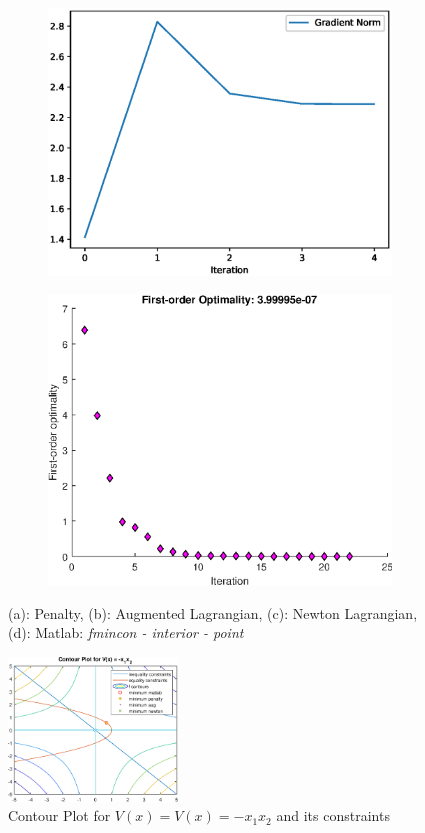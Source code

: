 \begin{figure}[h!]
\begin{subfigure}[t]{0.4\textwidth}
    \includegraphics[width=\textwidth]{images/python/al-pE-ln.eps}
    \caption{}
    \label{fig:TSNE}
\end{subfigure}
\hfill
\begin{subfigure}[t]{0.4\textwidth}
\centering
    \includegraphics[width=\textwidth]{images/matlab/2b_loss.eps}
    \caption{}
    \label{fig:TSNE}
\end{subfigure}
\caption{(a): Penalty, (b): Augmented Lagrangian, (c): Newton Lagrangian, (d): Matlab: \textit{fmincon - interior - point}}
\end{figure}
\begin{figure}
    \centering
    \includegraphics[width=0.4\textwidth]{images/matlab/matlab_2b.eps}
    \caption{Contour Plot for $V(x) =  V(x) = - x_1 x_2$ and its constraints}
\end{figure}